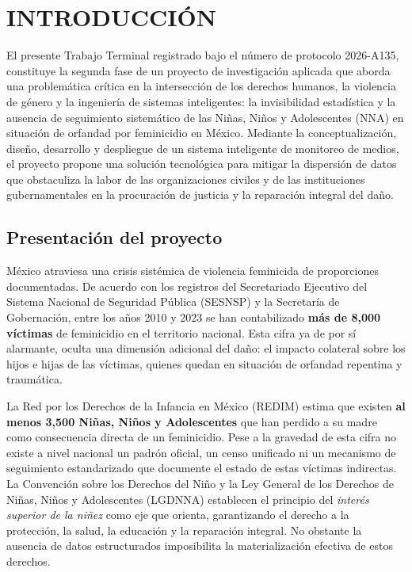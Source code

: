 

\chapter*{INTRODUCCIÓN}

El presente Trabajo Terminal registrado bajo el número de protocolo 2026-A135, constituye la segunda fase de un proyecto de investigación aplicada que aborda una problemática
crítica en la intersección de los derechos humanos, la violencia de género y la ingeniería de sistemas inteligentes: la invisibilidad estadística y la ausencia de seguimiento
sistemático de las Niñas, Niños y Adolescentes (NNA) en situación de orfandad por feminicidio en México. Mediante la conceptualización, diseño, desarrollo y despliegue de un
sistema inteligente de monitoreo de medios, el proyecto propone una solución tecnológica para mitigar la dispersión de datos que obstaculiza la labor de las organizaciones
civiles y de las instituciones gubernamentales en la procuración de justicia y la reparación integral del daño.


\section*{Presentación del proyecto}
\label{sec:presentacion}


México atraviesa una crisis sistémica de violencia feminicida de proporciones documentadas. De acuerdo con los registros del Secretariado Ejecutivo del Sistema Nacional de Seguridad
Pública (SESNSP) y la Secretaría de Gobernación, entre los años 2010 y 2023 se han contabilizado \textbf{más de 8{,}000 víctimas} de feminicidio en el territorio nacional. Esta cifra
ya de por sí alarmante, oculta una dimensión adicional del daño: el impacto colateral sobre los hijos e hijas de las víctimas, quienes quedan en situación de orfandad repentina y traumática.

La Red por los Derechos de la Infancia en México (REDIM) estima que existen \textbf{al menos 3{,}500 Niñas, Niños y Adolescentes} que han perdido a su madre como consecuencia directa de un
feminicidio. Pese a la gravedad de esta cifra no existe a nivel nacional un padrón oficial, un censo unificado ni un mecanismo de seguimiento estandarizado que documente el estado de estas
víctimas indirectas. La Convención sobre los Derechos del Niño y la Ley General de los Derechos de Niñas, Niños y Adolescentes (LGDNNA) establecen el principio del \textit{interés superior
de la niñez} como eje que orienta, garantizando el derecho a la protección, la salud, la educación y la reparación integral. No obstante la ausencia de datos estructurados imposibilita la
materialización efectiva de estos derechos.


